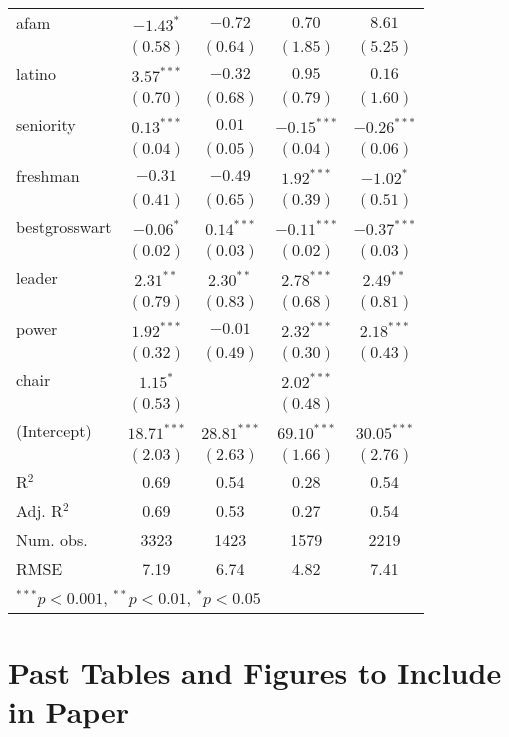 \documentclass[12pt]{article}
\begin{document}
\begin{table}
\begin{center}
\begin{tabular}{l c c c c }
			afam                   & $-1.43^{*}$   & $-0.72$       & $0.70$        & $8.61$        \\
			& $(0.58)$      & $(0.64)$      & $(1.85)$      & $(5.25)$      \\
			latino                 & $3.57^{***}$  & $-0.32$       & $0.95$        & $0.16$        \\
			& $(0.70)$      & $(0.68)$      & $(0.79)$      & $(1.60)$      \\
			seniority              & $0.13^{***}$  & $0.01$        & $-0.15^{***}$ & $-0.26^{***}$ \\
			& $(0.04)$      & $(0.05)$      & $(0.04)$      & $(0.06)$      \\
			freshman               & $-0.31$       & $-0.49$       & $1.92^{***}$  & $-1.02^{*}$   \\
			& $(0.41)$      & $(0.65)$      & $(0.39)$      & $(0.51)$      \\
			bestgrosswart          & $-0.06^{*}$   & $0.14^{***}$  & $-0.11^{***}$ & $-0.37^{***}$ \\
			& $(0.02)$      & $(0.03)$      & $(0.02)$      & $(0.03)$      \\
			leader                 & $2.31^{**}$   & $2.30^{**}$   & $2.78^{***}$  & $2.49^{**}$   \\
			& $(0.79)$      & $(0.83)$      & $(0.68)$      & $(0.81)$      \\
			power                  & $1.92^{***}$  & $-0.01$       & $2.32^{***}$  & $2.18^{***}$  \\
			& $(0.32)$      & $(0.49)$      & $(0.30)$      & $(0.43)$      \\
			chair                  & $1.15^{*}$    &               & $2.02^{***}$  &               \\
			& $(0.53)$      &               & $(0.48)$      &               \\
			(Intercept)            & $18.71^{***}$ & $28.81^{***}$ & $69.10^{***}$ & $30.05^{***}$ \\
			& $(2.03)$      & $(2.63)$      & $(1.66)$      & $(2.76)$      \\
			\hline
			R$^2$                  & 0.69          & 0.54          & 0.28          & 0.54          \\
			Adj. R$^2$             & 0.69          & 0.53          & 0.27          & 0.54          \\
			Num. obs.              & 3323          & 1423          & 1579          & 2219          \\
			RMSE                   & 7.19          & 6.74          & 4.82          & 7.41          \\
			\hline
			\multicolumn{5}{l}{\scriptsize{$^{***}p<0.001$, $^{**}p<0.01$, $^*p<0.05$}}
		\end{tabular}
	\end{center}
\end{table}

\section{Past Tables and Figures to Include in Paper}
\end{document}
